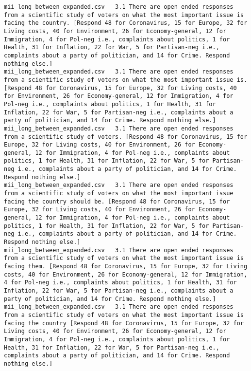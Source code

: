 \begin{lstlisting}[label=lst:promptvariants]
mii_long_between_expanded.csv	3.1	There are open ended responses from a scientific study of voters on what the most important issue is facing the country. [Respond 48 for Coronavirus, 15 for Europe, 32 for Living costs, 40 for Environment, 26 for Economy-general, 12 for Immigration, 4 for Pol-neg i.e., complaints about politics, 1 for Health, 31 for Inflation, 22 for War, 5 for Partisan-neg i.e., complaints about a party of politician, and 14 for Crime. Respond nothing else.]
mii_long_between_expanded.csv	3.1	There are open ended responses from a scientific study of voters on what the most important issue is. [Respond 48 for Coronavirus, 15 for Europe, 32 for Living costs, 40 for Environment, 26 for Economy-general, 12 for Immigration, 4 for Pol-neg i.e., complaints about politics, 1 for Health, 31 for Inflation, 22 for War, 5 for Partisan-neg i.e., complaints about a party of politician, and 14 for Crime. Respond nothing else.]
mii_long_between_expanded.csv	3.1	There are open ended responses from a scientific study of voters. [Respond 48 for Coronavirus, 15 for Europe, 32 for Living costs, 40 for Environment, 26 for Economy-general, 12 for Immigration, 4 for Pol-neg i.e., complaints about politics, 1 for Health, 31 for Inflation, 22 for War, 5 for Partisan-neg i.e., complaints about a party of politician, and 14 for Crime. Respond nothing else.]
mii_long_between_expanded.csv	3.1	There are open ended responses from a scientific study of voters on what the most important issue facing the country should be. [Respond 48 for Coronavirus, 15 for Europe, 32 for Living costs, 40 for Environment, 26 for Economy-general, 12 for Immigration, 4 for Pol-neg i.e., complaints about politics, 1 for Health, 31 for Inflation, 22 for War, 5 for Partisan-neg i.e., complaints about a party of politician, and 14 for Crime. Respond nothing else.]
mii_long_between_expanded.csv	3.1	There are open ended responses from a scientific study of voters on what the most important issue is facing them. [Respond 48 for Coronavirus, 15 for Europe, 32 for Living costs, 40 for Environment, 26 for Economy-general, 12 for Immigration, 4 for Pol-neg i.e., complaints about politics, 1 for Health, 31 for Inflation, 22 for War, 5 for Partisan-neg i.e., complaints about a party of politician, and 14 for Crime. Respond nothing else.]
mii_long_between_expanded.csv	3.1	There are open ended responses from a scientific study of voters on what the most important issue is facing the country [Respond 48 for Coronavirus, 15 for Europe, 32 for Living costs, 40 for Environment, 26 for Economy-general, 12 for Immigration, 4 for Pol-neg i.e., complaints about politics, 1 for Health, 31 for Inflation, 22 for War, 5 for Partisan-neg i.e., complaints about a party of politician, and 14 for Crime. Respond nothing else.]

\end{lstlisting}
